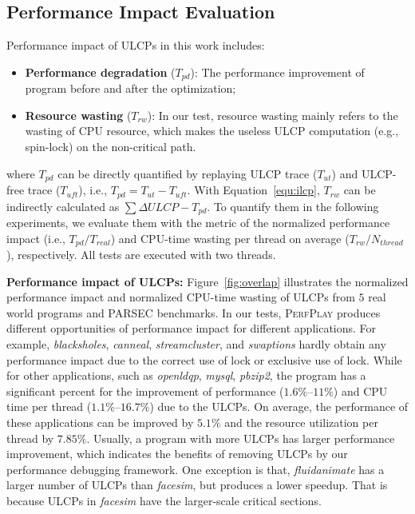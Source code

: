 \subsection{Performance Impact Evaluation}
\label{sec:perf}
Performance impact of ULCPs in this work includes:
\begin{itemize}
  \item \textbf{Performance degradation} ($T_{pd}$): The performance improvement of program before and after the optimization;
  \item \textbf{Resource wasting} ($T_{rw}$): In our test, resource wasting mainly refers to the wasting of CPU resource, which makes the useless ULCP computation (e.g., spin-lock) on the non-critical path.
\end{itemize}
\noindent where $T_{pd}$ can be directly quantified by replaying ULCP trace ($T_{ut}$) and ULCP-free trace ($T_{uft}$), i.e., $T_{pd}=T_{ut}-T_{uft}$. With Equation~\ref{equ:ilcp}, $T_{rw}$ can be indirectly calculated as $\sum \Delta ULCP -T_{pd}$. To quantify them in the following experiments, we evaluate them with the metric of the normalized performance impact (i.e., ${T_{pd}}/{T_{real}}$) and CPU-time wasting per thread on average (${T_{rw}}/{N_{thread}}$), respectively.
All tests are executed with two threads. 

\textbf{Performance impact of ULCPs:} Figure~\ref{fig:overlap} illustrates the normalized performance impact and normalized CPU-time wasting of ULCPs from $5$ real world programs and PARSEC benchmarks. In our tests, \textsc{PerfPlay} produces different opportunities of performance impact for different applications. For example, \emph{blacksholes}, \emph{canneal}, \emph{streamcluster}, and \emph{swaptions} hardly obtain any performance impact due to the correct use of lock or exclusive use of lock. While for other applications, such as \emph{openldqp}, \emph{mysql}, \emph{pbzip2}, the program has a significant percent for the improvement of performance ($1.6\%$--$11\%$) and CPU time per thread ($1.1\%$--$16.7\%$) due to the ULCPs. On average, the performance of these applications can be improved by $5.1\%$ and the resource utilization per thread by $7.85\%$. Usually, a program with more ULCPs has larger performance improvement, which indicates the benefits of removing ULCPs by our performance debugging framework. One exception is that, \emph{fluidanimate} has a larger number of ULCPs than \emph{facesim}, but produces a lower speedup. That is because ULCPs in \emph{facesim} have the larger-scale critical sections.

